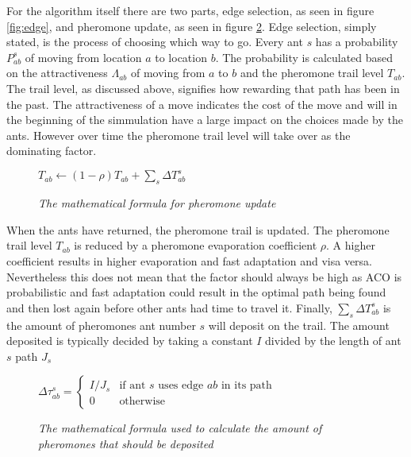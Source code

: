 For the algorithm itself there are two parts, edge selection, as seen in figure \ref{fig:edge}, and pheromone update, as seen in figure \ref{fig:update}. 
Edge selection, simply stated, is the process of choosing which way to go. Every ant $s$ has a probability $P^s_{ab}$ of moving from location $a$ to location $b$. The probability
is calculated based on the attractiveness $\Lambda_{ab}$  of moving from $a$ to $b$ and the pheromone trail level $T_{ab}$. The trail level,
as discussed above, signifies how rewarding that path has been in the past. The attractiveness of a move indicates the cost of the move and 
will in the beginning of the simmulation have a large impact on the choices made by the ants. However over time the pheromone trail level will take over as the
dominating factor.

\begin{figure}[h]
\centering
\begin{math}
T_{ab} \leftarrow (1 - \rho)T_{ab} + \sum \limits_{s} \Delta T^s_{ab}
\end{math}
\caption{\textit{The mathematical formula for pheromone update}}
\label{fig:update}
\end{figure}

When the ants have returned, the pheromone trail is updated. The pheromone trail level $T_{ab}$ is reduced by a pheromone evaporation
coefficient $\rho$. A higher coefficient results in higher evaporation and fast adaptation and visa versa. Nevertheless this does not mean
that the factor should always be high as ACO is probabilistic and fast adaptation could result in the optimal path being found and then lost
again before other ants had time to travel it. Finally, $\sum \limits_{s} \Delta T^s_{ab}$ is the amount of pheromones ant number $s$ will deposit on
the trail. The amount deposited is typically decided by taking a constant $I$ divided by the length of ant $s$ path $J_s$

\begin{figure}[h]
\centering
\begin{math}
\Delta \tau^{s}_{ab} =
\begin{cases}
I/J_s & \mbox{if ant }s\mbox{ uses edge }ab\mbox{ in its path} \\
0 & \mbox{otherwise}
\end{cases}
\end{math}
\caption{\textit{The mathematical formula used to calculate the amount of pheromones that should be deposited}}
\label{fig:update}
\end{figure}

